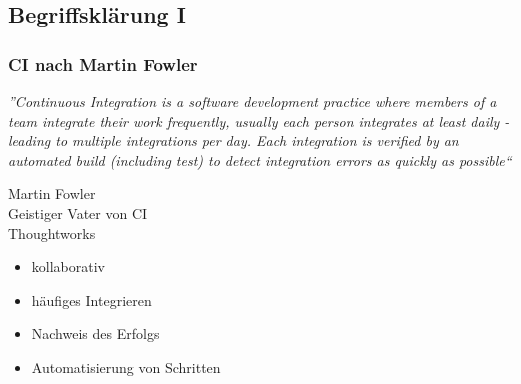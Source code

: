 \documentclass[hyperref={pdfpagelabels=false}]{beamer}
\begin{document}
\subsection{Begriffsklärung I}
\begin{frame} [t]
\frametitle{CI nach Martin Fowler}
 {
\begin{center}
\textit{”Continuous Integration is a software development practice where members of a team integrate their
work frequently, usually each person integrates at least daily - leading to multiple integrations per day.
Each integration is verified by an automated build (including test) to detect integration errors as
quickly as possible“}
\end{center}
\vspace{0.5cm} 
\begin{flushright}
\footnotesize{Martin Fowler\\ Geistiger Vater von CI\\ Thoughtworks}
\end{flushright}
}
 {
\vspace{0.5cm} 
\begin{multicols}{2}
\begin{itemize}
	\item kollaborativ
	\item häufiges Integrieren
	\item Nachweis des Erfolgs
	\item Automatisierung von Schritten
\end{itemize}
\end{multicols}
}
\end{frame}
\end{document}
